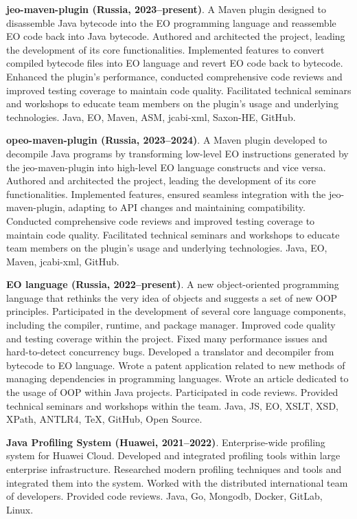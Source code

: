 \documentclass{vl}
\begin{document}
    \textbf{jeo-maven-plugin (Russia, 2023--present)}.
    A Maven plugin designed to disassemble Java bytecode into the EO programming language and reassemble EO code back
    into Java bytecode.
    Authored and architected the project, leading the development of its core functionalities.
    Implemented features to convert compiled bytecode files into EO language and revert EO code back to bytecode.
    Enhanced the plugin's performance, conducted comprehensive code reviews and improved testing coverage to maintain
    code quality.
    Facilitated technical seminars and workshops to educate team members on the plugin's usage and underlying
    technologies.
    Java, EO, Maven, ASM, jcabi-xml, Saxon-HE, GitHub.

    \textbf{opeo-maven-plugin (Russia, 2023--2024)}.
    A Maven plugin developed to decompile Java programs by transforming low-level EO instructions
    generated by the jeo-maven-plugin into high-level EO language constructs and vice versa.
    Authored and architected the project, leading the development of its core functionalities.
    Implemented features, ensured seamless integration with the jeo-maven-plugin, adapting to API changes and
    maintaining compatibility.
    Conducted comprehensive code reviews and improved testing coverage to maintain code quality.
    Facilitated technical seminars and workshops to educate team members on the plugin's usage and underlying
    technologies.
    Java, EO, Maven, jcabi-xml, GitHub.

    \textbf{EO language (Russia, 2022--present)}.
    A new object-oriented programming language
    that rethinks the very idea of objects and suggests a set of new OOP principles.
    Participated in the development of several core language components,
    including the compiler, runtime, and package manager.
    Improved code quality and testing coverage within the project.
    Fixed many performance issues and hard-to-detect concurrency bugs.
    Developed a translator and decompiler from bytecode to EO language.
    Wrote a patent application related to new methods of managing dependencies in programming languages.
    Wrote an article dedicated to the usage of OOP within Java projects.
    Participated in code reviews.
    Provided technical seminars and workshops within the team.
    Java, JS, EO, XSLT, XSD, XPath, ANTLR4, TeX, GitHub, Open Source.

    \textbf{Java Profiling System (Huawei, 2021--2022)}.
    Enterprise-wide profiling system for Huawei Cloud.
    Developed and integrated profiling tools within large enterprise infrastructure.
    Researched modern profiling techniques and tools and integrated them into the system.
    Worked with the distributed international team of developers.
    Provided code reviews.
    Java, Go, Mongodb, Docker, GitLab, Linux.
\end{document}
